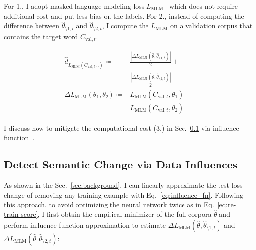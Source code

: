 For 1., I adopt masked language modeling loss $L_\text{MLM}$~\cite{BERT} which does not require additional cost and 
put less bias on the labels.
For 2., instead of computing the difference between $\hat{\theta}_{\setminus 1, t}$ and $\hat{\theta}_{\setminus 2, t}$, I compute the $L_\text{MLM}$ on a validation corpus that contains the target word $C_{\text{val}, t}$.


\begin{align}
\begin{split}
    \hat{d}_{L_\text{MLM}(C_{\text{val}, t}, .)} \coloneqq &\frac{|\Delta L_\text{MLM}(\hat{\theta}, \hat{\theta}_{\setminus 1, t})|}{2} + \\
        &\frac{|\Delta L_\text{MLM}(\hat{\theta}, \hat{\theta}_{\setminus 2, t})|}{2}\\
    \Delta L_\text{MLM}(\theta_1, \theta_2) \coloneqq &L_\text{MLM}(C_{\text{val}, t}, \theta_1) - \\&L_\text{MLM}(C_{\text{val}, t}, \theta_2)
    \label{eq:scores_mlm}
\end{split}
\end{align}

\noindent I discuss how to mitigate the computational cost (3.) in Sec.~\ref{sec:influence_fn} via influence function~\cite{influence_fn}.


\subsection{Detect Semantic Change via Data Influences}\label{sec:influence_fn}
As shown in the Sec.~\ref{sec:background}, I can linearly approximate the test loss change of removing any training example with Eq.~\ref{eq:influence_fn}.
Following this approach, to avoid optimizing the neural network twice as in Eq.~\ref{eq:re-train-score}, 
I first obtain the empirical minimizer of the full corpora $\hat{\theta}$ and perform influence function approximation to estimate $\Delta L_\text{MLM}(\hat{\theta}, \hat{\theta}_{\setminus 1, t})$ and 
$\Delta L_\text{MLM}(\hat{\theta}, \hat{\theta}_{\setminus 2, t})$:



